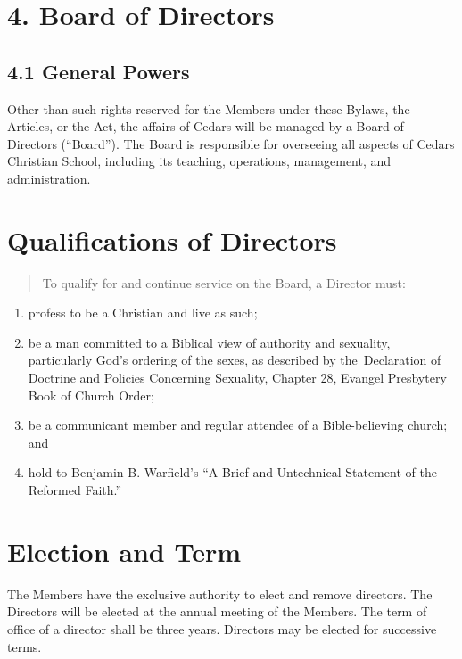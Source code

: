 \documentclass[
]{book}
\begin{document}
\section{4. Board of Directors}\label{board-of-directors}

\subsection{4.1 General Powers}\label{general-powers}

Other than such rights reserved for the Members under these Bylaws,
the Articles, or the Act, the affairs of Cedars will be managed by a
Board of Directors (``Board''). The Board is responsible for overseeing
all aspects of Cedars Christian School, including its teaching,
operations, management, and administration.

\section{Qualifications of Directors}\label{qualifications-of-directors}

\begin{quote}
To qualify for and continue service on the Board, a Director must:
\end{quote}

\begin{enumerate}
\def\labelenumi{\alph{enumi})}
\item
  profess to be a Christian and live as such;
\item
  be a man committed to a Biblical view of authority and sexuality,
  particularly God's ordering of the sexes, as described by
  the~Declaration of Doctrine and Policies Concerning Sexuality,
  Chapter 28, Evangel Presbytery Book of Church Order;
\item
  be a communicant member and regular attendee of a Bible-believing
  church; and
\item
  hold to Benjamin B. Warfield's ``A Brief and Untechnical Statement of
  the Reformed Faith.''
\end{enumerate}

\section{Election and Term}\label{election-and-term}

The Members have the exclusive authority to elect and remove
directors. The Directors will be elected at the annual meeting of the
Members. The term of office of a director shall be three years.
Directors may be elected for successive terms.
\end{document}
